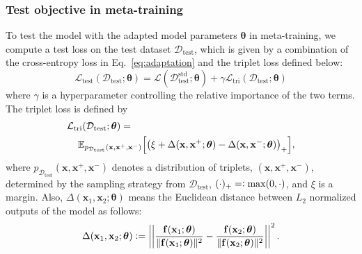 \documentclass[letterpaper]{article} %
\newcommand{\defeq}{\vcentcolon=}
\newcommand{\eqdef}{=\vcentcolon}
\def \x{\mathbf{x}}
\def \f{\mathbf{f}}
\def \dataval{\mathcal{D}_\text{test}}
\def \thetageneral{\boldsymbol{\theta}}
\def \lossval{\mathcal{L}_\text{test}}
\def \losstriple{\mathcal{L}_\text{tri}}
\begin{document}

\subsubsection{Test objective in meta-training}

To test the model with the adapted model parameters $\thetageneral$ in meta-training, we compute a test loss on the test dataset $\dataval$, which is given by a combination of the cross-entropy loss in Eq.~\eqref{eq:adaptation} and the triplet loss defined below:
\begin{equation}
\lossval(\dataval;\thetageneral) = \mathcal{L}(\dataval^\text{std};\thetageneral) +\gamma \losstriple(\dataval;\thetageneral)
\end{equation}
where $\gamma$ is a hyperparameter controlling the relative importance of the two terms.
The triplet loss is defined by
\begin{align}
&\losstriple (\dataval; \thetageneral)= \\
&\hspace{0.4cm}\mathbb{E}_{p_{\dataval}(\x, \x^{+}, \x^{-})}\Big[ \big(\xi + \Delta(\x, \x^{+}; \thetageneral) - \Delta(\x, \x^{-}; \thetageneral)\big)_+ \Big], \nonumber
\end{align}
where $p_{\dataval}(\x, \x^+, \x^-)$ denotes a distribution of triplets, $(\x, \x^+, \x^-)$, determined by the sampling strategy from  $\dataval$, $(\cdot)_+ \eqdef \max(0, \cdot)$, and $\xi$ is a margin.
Also, $\Delta(\x_1, \x_2; \thetageneral)$ means the Euclidean distance between $L_2$ normalized outputs of the model as follows:
\begin{align}
\Delta(\x_1, \x_2; \thetageneral) \defeq \left|\left| \frac{\f(\x_1 ;\thetageneral)}{\|\f(\x_1;\thetageneral) \|^2} - \frac{\f(\x_2;\thetageneral)}{\|\f(\x_2;\thetageneral)\|^2} \right|\right|^2.
\end{align}
\end{document}
